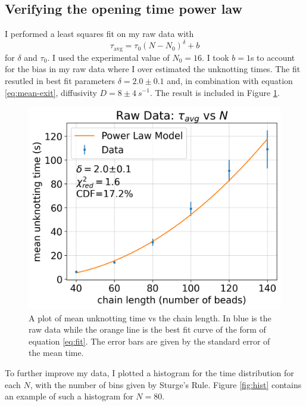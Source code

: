 \documentclass[11pt]{article}
\begin{document}
    \subsection{Verifying the opening time power law}
    I performed a least squares fit on my raw data with 
        \begin{equation}
            \label{eq:fit}
            \tau_{\text{avg}} = \tau_0 (N- N_0)^{\delta} + b
        \end{equation}
    for $\delta$ and $\tau_0$. I used the experimental value of $N_0=16$. I took $b=1$s
    to account for the bias in my raw data where I over estimated the unknotting times. 
    The fit resutled in best fit parameters $\delta = 2.0 \pm 0.1$ and, in combination 
    with equation \ref{eq:mean-exit}, diffusivity 
    $D= 8 \pm 4~\unit{s^{-1}}$. The result is included in Figure \ref{fig:raw}.\\
        \begin{figure}[h]
            \centering
            \includegraphics[scale=0.55]{raw.png}
            \caption{A plot of mean unknotting time vs the chain length. In blue is the raw
            data while the orange line is the best fit curve of the form of equation \ref{eq:fit}. 
            The error bars are given by the standard error of the mean time.}
            \label{fig:raw}
        \end{figure}

    To further improve my data, I plotted a histogram for the time distribution for each $N$, 
    with the number of bins given by Sturge's Rule. Figure \ref{fig:hist} contains an example of such a histogram for $N=80$.\\
\end{document}
